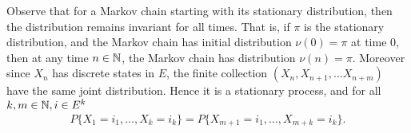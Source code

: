 \documentclass[a4paper,10pt,english]{article}
\begin{document}
Observe that for a Markov chain starting with its stationary distribution,  
then the distribution remains invariant for all times. %
That is, if $\pi$ is the stationary distribution, and the Markov chain has initial distribution $\nu(0) = \pi$ at time $0$, 
then at any time $n \in \mathbb{N}$, the Markov chain has distribution $\nu(n) = \pi$. 
Moreover since $X_n$ has discrete states in $E$, the finite collection $(X_n, X_{n+1}, ... X_{n+m})$ have the same joint distribution. 
Hence it is a stationary process, and for all $k, m \in \mathbb{N}, i \in E^k$
\begin{align*}
P\{X_1 = i_1,\ldots,X_k = i_k\} = P\{X_{m+1} = i_1,\ldots,X_{m+k} = i_k\}.
\end{align*}
\end{document}
